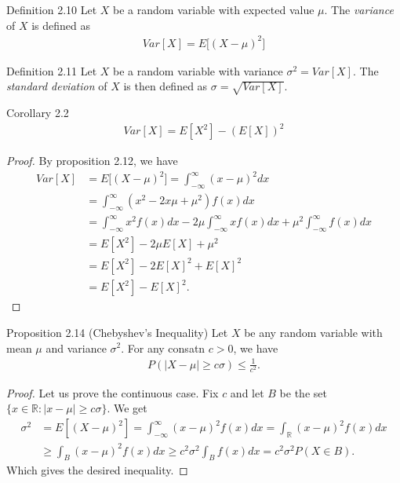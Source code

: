 \begin{boks}{Definition 2.10}
Let $X$ be a random variable with expected value $\mu$. The \textit{variance} of $X$ is defined as
\begin{align*}
    Var[X] = E\Big[ (X - \mu)^2 \Big]
\end{align*}
\end{boks}

\begin{boks}{Definition 2.11}
Let $X$ be a random variable with variance $\sigma^2 = Var[X]$. The \textit{standard deviation} of $X$ is then defined as $\sigma = \sqrt{Var[X]}$.
\end{boks}

\begin{boks}{Corollary 2.2}
\begin{align*}
    Var[X] = E[X^2] - (E[X])^2
\end{align*}
\end{boks}

\begin{proof}
By proposition 2.12, we have
\begin{align*}
    Var[X] &= E\Big[(X-\mu)^2\Big] = \int_{-\infty}^\infty (x - \mu)^2 dx\\
    &= \int_{-\infty}^\infty (x^2 - 2x\mu + \mu^2) f(x) dx \\
    &= \int_{-\infty}^\infty x^2 f(x) dx - 2\mu \int_{-\infty}^\infty x f(x) dx + \mu^2\int_{-\infty}^\infty f(x)dx\\
    &=E[X^2] - 2\mu E[X] + \mu^2\\
    &= E[X^2] - 2 E[X]^2 + E[X]^2\\
    &= E[X^2] - E[X]^2.
\end{align*}
\end{proof}

\begin{boks}{Proposition 2.14 (Chebyshev's Inequality)}
Let $X$ be any random variable with mean $\mu$ and variance $\sigma^2$. For any consatn $c > 0$, we have
\begin{align*}
    P(|X - \mu| \geq c\sigma) \leq \frac{1}{c^2}.
\end{align*}
\end{boks}

\begin{proof}
Let us prove the continuous case. Fix $c$ and let $B$ be the set $\{x \in \mathbb{R} : |x - \mu| \geq c\sigma\}$. We get
\begin{align*}
    \sigma^2 &= E[(X - \mu)^2] = \int_{-\infty}^\infty (x-\mu)^2f(x)dx=\int_\mathbb{R}(x-\mu)^2f(x)dx\\
    &\geq \int_B(x-\mu)^2f(x)dx \geq c^2\sigma^2\int_Bf(x)dx = c^2\sigma^2P(X\in B).
\end{align*}
Which gives the desired inequality.
\end{proof}
